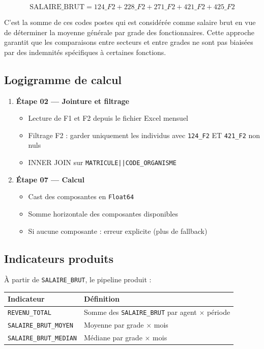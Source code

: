 \documentclass[12pt,a4paper,french]{article}
\newcommand{\colname}[1]{\texttt{#1}}
\newcommand{\code}[1]{\texttt{#1}}
\begin{document}
\[
\text{SALAIRE\_BRUT} = 124\_F2 + 228\_F2 + 271\_F2 + 421\_F2 + 425\_F2
\]

\begin{infobox}
    C'est la somme de ces codes postes qui est considérée comme salaire brut
    en vue de déterminer la moyenne générale par grade des fonctionnaires.
    Cette approche garantit que les comparaisons entre secteurs et entre grades
    ne sont pas biaisées par des indemnités spécifiques à certaines fonctions.
\end{infobox}

\subsection{Logigramme de calcul}

\begin{enumerate}
    \item \textbf{Étape 02 — Jointure et filtrage}
          \begin{itemize}
              \item Lecture de F1 et F2 depuis le fichier Excel mensuel
              \item Filtrage F2 : garder uniquement les individus avec
                    \code{124\_F2} ET \code{421\_F2} non nuls
              \item INNER JOIN sur \texttt{MATRICULE||CODE\_ORGANISME}
          \end{itemize}

    \item \textbf{Étape 07 — Calcul}
          \begin{itemize}
              \item Cast des composantes en \texttt{Float64}
              \item Somme horizontale des composantes disponibles
              \item Si aucune composante : erreur explicite (plus de fallback)
          \end{itemize}
\end{enumerate}

\subsection{Indicateurs produits}

À partir de \colname{SALAIRE\_BRUT}, le pipeline produit :

\begin{tabularx}{\textwidth}{lX}
    \toprule
    \textbf{Indicateur} & \textbf{Définition} \\
    \midrule
    \colname{REVENU\_TOTAL} & Somme des \colname{SALAIRE\_BRUT} par agent $\times$ période \\
    \colname{SALAIRE\_BRUT\_MOYEN} & Moyenne par grade $\times$ mois \\
    \colname{SALAIRE\_BRUT\_MEDIAN} & Médiane par grade $\times$ mois \\
    \bottomrule
\end{tabularx}
\end{document}

